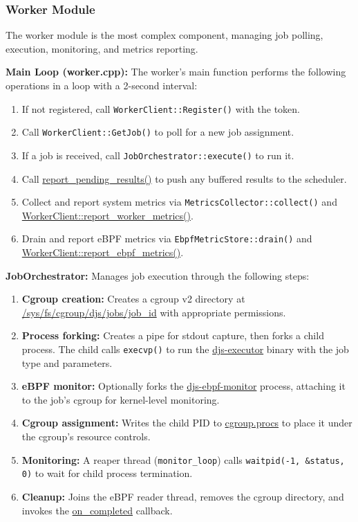 \subsubsection{Worker Module}

The worker module is the most complex component, managing job polling, execution, monitoring, and metrics reporting.

\textbf{Main Loop (worker.cpp):} The worker's main function performs the following operations in a loop with a 2-second interval:
\begin{enumerate}
	\item If not registered, call \texttt{WorkerClient::Register()} with the token.
	\item Call \texttt{WorkerClient::GetJob()} to poll for a new job assignment.
	\item If a job is received, call \texttt{JobOrchestrator::execute()} to run it.
	\item Call \url{report_pending_results()} to push any buffered results to the scheduler.
	\item Collect and report system metrics via \texttt{MetricsCollector::collect()} and \url{WorkerClient::report_worker_metrics()}.
	\item Drain and report eBPF metrics via \texttt{EbpfMetricStore::drain()} and \url{WorkerClient::report_ebpf_metrics()}.
\end{enumerate}

\textbf{JobOrchestrator:} Manages job execution through the following steps:

\begin{enumerate}
	\item \textbf{Cgroup creation:} Creates a cgroup v2 directory at \url{/sys/fs/cgroup/djs/jobs/job_id} with appropriate permissions.
	\item \textbf{Process forking:} Creates a pipe for stdout capture, then forks a child process. The child calls \texttt{execvp()} to run the \url{djs-executor} binary with the job type and parameters.
	\item \textbf{eBPF monitor:} Optionally forks the \url{djs-ebpf-monitor} process, attaching it to the job's cgroup for kernel-level monitoring.
	\item \textbf{Cgroup assignment:} Writes the child PID to \url{cgroup.procs} to place it under the cgroup's resource controls.
	\item \textbf{Monitoring:} A reaper thread (\texttt{monitor\_loop}) calls \texttt{waitpid(-1, \&status, 0)} to wait for child process termination.
	\item \textbf{Cleanup:} Joins the eBPF reader thread, removes the cgroup directory, and invokes the \url{on_completed} callback.
\end{enumerate}

